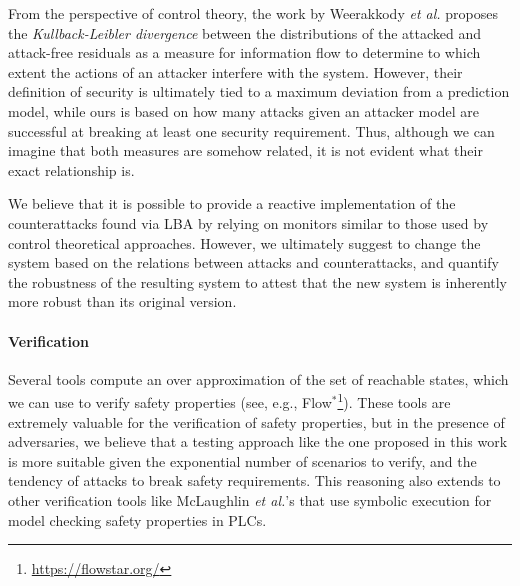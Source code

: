 {From the perspective of control theory, the work by Weerakkody \emph{et al.} \cite{IFCPSSec} proposes the \emph{Kullback-Leibler divergence} between the distributions of the attacked and attack-free residuals as {a measure for information flow} to determine to which extent the actions of an attacker interfere with the system. However, their definition of security is ultimately tied to a maximum deviation from a prediction model, while ours is based on how many attacks given an attacker model are successful at breaking at least one security requirement. Thus, although we can imagine that both measures are somehow related, it is not evident what their exact relationship is.

We believe that it is possible to provide a reactive implementation of the counterattacks found via LBA by relying on monitors similar to those used by control theoretical approaches. However, we ultimately suggest to change the system based on the relations between attacks and counterattacks, and quantify the robustness of the resulting system to attest that the new system is inherently more robust than its original version.
 

\paragraph{Verification}
Several tools compute an over approximation of the set of reachable states, which we can use to verify safety properties (see, e.g., Flow$^*$\footnote{\url{https://flowstar.org/}}). 
These tools are extremely valuable for the verification of safety properties, but in the presence of adversaries, we believe that a testing approach like the one proposed in this work is more suitable given the exponential number of scenarios to verify, and the tendency of attacks to break safety requirements. This reasoning also extends to other verification tools like McLaughlin \emph{et al.}'s \cite{TSVPLC} that use symbolic execution for model checking safety properties in PLCs.

{
}
}
